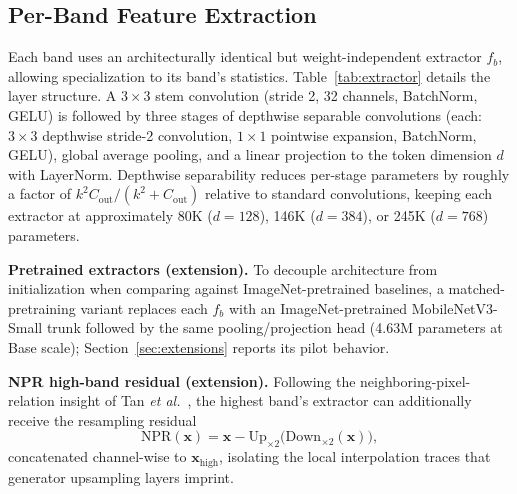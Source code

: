 \documentclass[journal]{IEEEtran}
\begin{document}
\subsection{Per-Band Feature Extraction}
\label{sec:extractor}
Each band uses an architecturally identical but weight-independent extractor $f_b$, allowing specialization to its band's statistics. Table~\ref{tab:extractor} details the layer structure. A $3\times3$ stem convolution (stride 2, 32 channels, BatchNorm, GELU) is followed by three stages of depthwise separable convolutions (each: $3\times3$ depthwise stride-2 convolution, $1\times1$ pointwise expansion, BatchNorm, GELU), global average pooling, and a linear projection to the token dimension $d$ with LayerNorm. Depthwise separability reduces per-stage parameters by roughly a factor of $k^2 C_{\mathrm{out}} / (k^2 + C_{\mathrm{out}})$ relative to standard convolutions, keeping each extractor at approximately 80K ($d{=}128$), 146K ($d{=}384$), or 245K ($d{=}768$) parameters.

\textbf{Pretrained extractors (extension).} To decouple architecture from initialization when comparing against ImageNet-pretrained baselines, a matched-pretraining variant replaces each $f_b$ with an ImageNet-pretrained MobileNetV3-Small trunk followed by the same pooling/projection head (4.63M parameters at Base scale); Section~\ref{sec:extensions} reports its pilot behavior.

\textbf{NPR high-band residual (extension).} Following the neighboring-pixel-relation insight of Tan \textit{et al.}~\cite{tan2024npr}, the highest band's extractor can additionally receive the resampling residual
\begin{equation}
\mathrm{NPR}(\mathbf{x}) = \mathbf{x} - \mathrm{Up}_{\times 2}\!\big(\mathrm{Down}_{\times 2}(\mathbf{x})\big),
\label{eq:npr}
\end{equation}
concatenated channel-wise to $\mathbf{x}_{\mathrm{high}}$, isolating the local interpolation traces that generator upsampling layers imprint.
\end{document}
